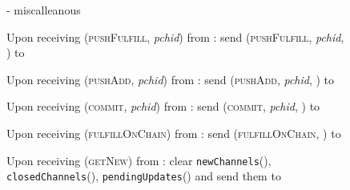   \begin{figure}[H]
    \begin{systembox}{\fpaynet - miscalleanous}
      \begin{algorithmic}[1]
        \State Upon receiving (\textsc{pushFulfill}, \textit{pchid}) from
        \alice:
        \Indent
          \State send (\textsc{pushFulfill}, \textit{pchid}, \alice) to
          \simulator
        \EndIndent
        \Statex

        \State Upon receiving (\textsc{pushAdd}, \textit{pchid}) from \alice:
        \Indent
          \State send (\textsc{pushAdd}, \textit{pchid}, \alice) to \simulator
        \EndIndent
        \Statex

        \State Upon receiving (\textsc{commit}, \textit{pchid}) from \alice:
        \Indent
          \State send (\textsc{commit}, \textit{pchid}, \alice) to \simulator
        \EndIndent
        \Statex

        \State Upon receiving (\textsc{fulfillOnChain}) from \alice:
        \Indent
          \State send (\textsc{fulfillOnChain}, \alice) to \simulator
        \EndIndent
        \Statex

        \State Upon receiving (\textsc{getNew}) from \alice:
        \Indent
          \State clear \texttt{newChannels}(\alice),
          \texttt{closedChannels}(\alice), \texttt{pendingUpdates}(\alice) and
          send them to \alice
        \EndIndent
      \end{algorithmic}
    \end{systembox}
    \caption{}
    \label{alg:fpaynet:misc}
  \end{figure}
